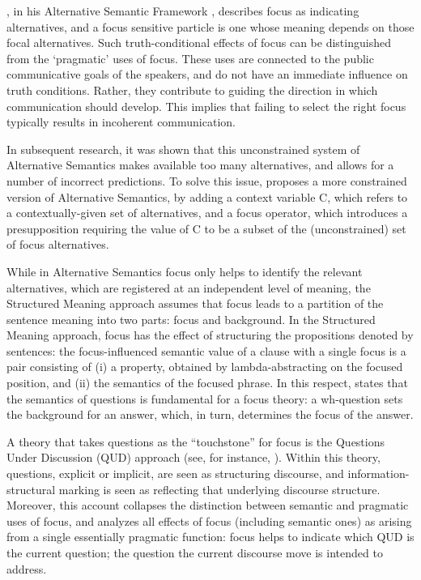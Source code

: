 \textcite{rooth1985association}, in his Alternative Semantic Framework \parencite{rooth1985association, rooth1992theory}, describes focus as indicating alternatives, and a focus sensitive particle is one whose meaning depends on those focal alternatives.
Such truth-conditional effects of focus can be distinguished from the `pragmatic’ uses of focus. These uses are connected to the public communicative goals of the speakers, and do not have an immediate influence on truth conditions. Rather, they contribute to guiding the direction in which communication should develop. This implies that failing to select the right focus typically results in incoherent communication. 

In subsequent research, it was shown that this unconstrained system of Alternative Semantics makes available too many alternatives, and allows for a number of incorrect predictions. To solve this issue, \textcite{rooth1992theory} proposes a more constrained version of Alternative Semantics, by adding a context variable C, which refers to a contextually-given set of alternatives, and a focus operator, which introduces a presupposition requiring the value of C to be a subset of the (unconstrained) set of focus alternatives.

While in Alternative Semantics focus only helps to identify the relevant alternatives, which are registered at an independent level of meaning, the Structured Meaning approach \parencite{von1982structured, von1990current, jacobs2012fokus, krifka1991compositional, krifka2008basic} assumes that focus leads to a partition of the sentence meaning into two parts: focus and background. In the Structured Meaning approach, focus has the effect of structuring the propositions denoted by sentences: the focus-influenced semantic value of a clause with a single focus is a pair consisting of (i) a property, obtained by lambda-abstracting on the focused position, and (ii) the semantics of the focused phrase.
In this respect, \textcite[38]{von1991focusing} states that the semantics of questions is fundamental for a focus theory: a wh-question sets the background for an answer, which, in turn, determines the focus of the answer. 

A theory that takes questions as the ``touchstone” for focus is the Questions Under Discussion (QUD) approach (see, for instance, \cite{roberts1996information, buring2003d, beaver2009sense}). Within this theory, 
questions, explicit or implicit, are seen as structuring discourse, and information-structural marking is seen as reflecting that underlying discourse structure. Moreover, this account collapses the distinction between semantic and pragmatic uses of focus, and analyzes all effects of focus (including semantic ones) as arising from a single essentially pragmatic function: focus helps to indicate which QUD is the current question; the question the current discourse move is intended to address.

